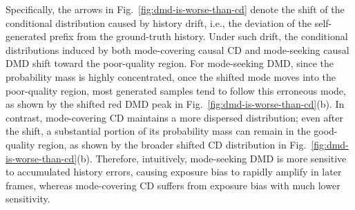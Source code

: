 Specifically, the arrows in Fig.~\ref{fig:dmd-is-worse-than-cd} denote the shift of the conditional distribution caused by history drift, i.e., the deviation of the self-generated prefix from the ground-truth history. Under such drift, the conditional distributions induced by both mode-covering causal CD and mode-seeking causal DMD shift toward the poor-quality region. For mode-seeking DMD, since the probability mass is highly concentrated, once the shifted mode moves into the poor-quality region, most generated samples tend to follow this erroneous mode, as shown by the shifted red DMD peak in Fig.~\ref{fig:dmd-is-worse-than-cd}(b). In contrast, mode-covering CD maintains a more dispersed distribution; even after the shift, a substantial portion of its probability mass can remain in the good-quality region, as shown by the broader shifted CD distribution in Fig.~\ref{fig:dmd-is-worse-than-cd}(b). Therefore, intuitively, mode-seeking DMD is more sensitive to accumulated history errors, causing exposure bias to rapidly amplify in later frames, whereas mode-covering CD suffers from exposure bias with much lower sensitivity.
